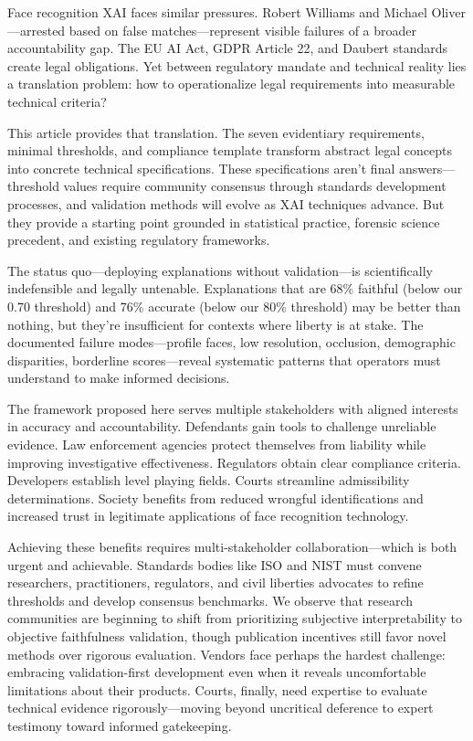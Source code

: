 Face recognition XAI faces similar pressures. Robert Williams and Michael Oliver—arrested based on false matches—represent visible failures of a broader accountability gap. The EU AI Act, GDPR Article 22, and Daubert standards create legal obligations. Yet between regulatory mandate and technical reality lies a translation problem: how to operationalize legal requirements into measurable technical criteria?

This article provides that translation. The seven evidentiary requirements, minimal thresholds, and compliance template transform abstract legal concepts into concrete technical specifications. These specifications aren't final answers—threshold values require community consensus through standards development processes, and validation methods will evolve as XAI techniques advance. But they provide a starting point grounded in statistical practice, forensic science precedent, and existing regulatory frameworks.

The status quo—deploying explanations without validation—is scientifically indefensible and legally untenable. Explanations that are 68\% faithful (below our 0.70 threshold) and 76\% accurate (below our 80\% threshold) may be better than nothing, but they're insufficient for contexts where liberty is at stake. The documented failure modes—profile faces, low resolution, occlusion, demographic disparities, borderline scores—reveal systematic patterns that operators must understand to make informed decisions.

The framework proposed here serves multiple stakeholders with aligned interests in accuracy and accountability. Defendants gain tools to challenge unreliable evidence. Law enforcement agencies protect themselves from liability while improving investigative effectiveness. Regulators obtain clear compliance criteria. Developers establish level playing fields. Courts streamline admissibility determinations. Society benefits from reduced wrongful identifications and increased trust in legitimate applications of face recognition technology.

Achieving these benefits requires multi-stakeholder collaboration—which is both urgent and achievable. Standards bodies like ISO and NIST must convene researchers, practitioners, regulators, and civil liberties advocates to refine thresholds and develop consensus benchmarks. We observe that research communities are beginning to shift from prioritizing subjective interpretability to objective faithfulness validation, though publication incentives still favor novel methods over rigorous evaluation. Vendors face perhaps the hardest challenge: embracing validation-first development even when it reveals uncomfortable limitations about their products. Courts, finally, need expertise to evaluate technical evidence rigorously—moving beyond uncritical deference to expert testimony toward informed gatekeeping.

